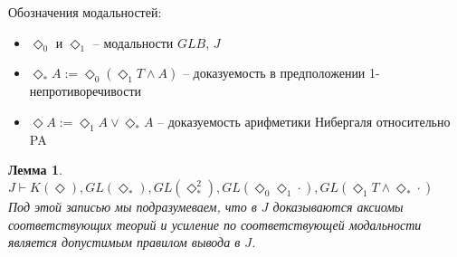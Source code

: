 \documentclass[12pt,a4paper,oneside]{article}
\newtheorem{lemma}{Лемма}
\begin{document}
  Обозначения модальностей:
  \begin{itemize}
    \item $\Diamond_0$ и $\Diamond_1$ -- модальности $GLB$, $J$
    \item $\Diamond_* A := \Diamond_0(\Diamond_1 T \wedge A)$ -- доказуемость в предположении
          1-непротиворечивости
    \item $\Diamond A := \Diamond_1 A \vee \Diamond_* A$ -- доказуемость арифметики Нибергаля
          относительно PA
  \end{itemize}

  \begin{lemma}
    $J \vdash K(\Diamond), GL(\Diamond_*), GL(\Diamond_*^2), GL(\Diamond_0\Diamond_1\cdot),
    GL(\Diamond_1 T \wedge \Diamond_*\cdot)$\\ Под этой записью мы подразумеваем, что в $J$
    доказываются аксиомы соответствующих теорий и усиление по соответствующей модальности является
    допустимым правилом вывода в $J$.
  \end{lemma}
\end{document}
